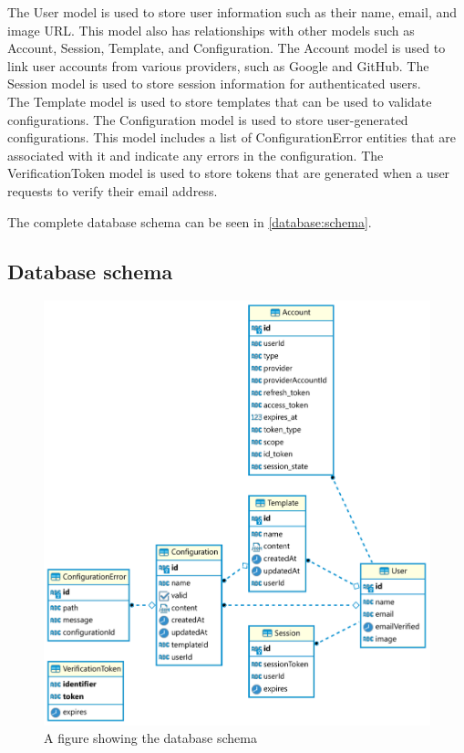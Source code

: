 \noindent
The User model is used to store user information such as their name, email, and image URL. This model also has relationships with other models such as Account, Session, Template, and Configuration. The Account model is used to link user accounts from various providers, such as Google and GitHub. The Session model is used to store session information for authenticated users. \\

\noindent
The Template model is used to store templates that can be used to validate configurations. The Configuration model is used to store user-generated configurations. This model includes a list of ConfigurationError entities that are associated with it and indicate any errors in the configuration. The VerificationToken model is used to store tokens that are generated when a user requests to verify their email address.

\noindent
The complete database schema can be seen in \autoref{database:schema}.

\newpage
\subsection{Database schema}
\vspace*{1cm}

\begin{figure}[!ht]
    \begin{minipage}{1\textwidth}
         \centering
      \includegraphics[width=.95\textwidth]{Figures/appendix/DB-schema.pdf}
     \caption[Database schema]{A figure showing the database schema}
     \label{database:schema}
    \end{minipage}\hfill
\end{figure}

